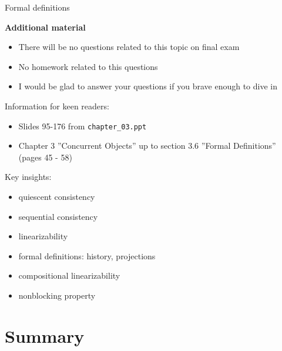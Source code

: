 \begin{frame}{Formal definitions}

\textbf{Additional material}
\begin{itemize}
  \item There will be no questions related to this topic on final exam
  \item No homework related to this questions
  \item I would be glad to answer your questions if you brave enough to dive in 
\end{itemize}

Information for keen readers:
\begin{itemize}
  \item Slides 95-176 from \texttt{chapter\_03.ppt}
  \item Chapter 3 ''Concurrent Objects'' up to section 3.6 ''Formal Definitions'' (pages 45 - 58)
\end{itemize}

Key insights: 
\begin{itemize}
  \item quiescent consistency
  \item sequential consistency
  \item linearizability
  \item formal definitions: history, projections
  \item compositional linearizability
  \item nonblocking property
\end{itemize}

\end{frame}

\section{Summary}

